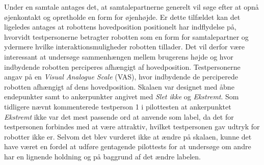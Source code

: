 Under en samtale antages det, at samtalepartnerne generelt vil søge efter at opnå øjenkontakt og opretholde en form for øjenhøjde. Er dette tilfældet kan det ligeledes antages at robottens hovedposition positionelt har indflydelse på, hvorvidt testpersonerne betragter robotten som en form for samtalepartner og ydermere hvilke interaktionsmuligheder robotten tillader. Det vil derfor være interessant at undersøge sammenhængen mellem brugerens højde og hvor indbydende robotten perciperes afhængigt af hovedposition.\blankline  
%
Testpersonerne angav på en \textit{Visual Analogue Scale} (VAS), hvor indbydende de perciperede robotten afhængigt af dens hovedposition. Skalaen var designet med åbne endepunkter samt to ankerpunkter angivet med \textit{Slet ikke} og \textit{Ekstremt}. Som tidligere nævnt kommenterede testperson 1 i pilottesten at ankerpunktet \textit{Ekstremt} ikke var det mest passende ord at anvende som label, da det for testpersonen forbindes med at være attraktiv, hvilket testpersonen gav udtryk for robotter ikke er. Selvom det blev vurderet ikke at ændre på skalaen, kunne det have været en fordel at udføre gentagende pilottests for at undersøge om andre har en lignende holdning og på baggrund af det ændre labelen.    

